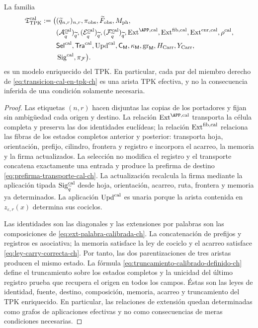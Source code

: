 \begin{proposition}
\label{prop:modelo-tpk-calibrado-ch}
La familia
\[
\begin{aligned}
 \mathfrak T_{\rm TPK}^{\rm cal}:=\bigl(
 &(\widetilde q_{n,r})_{n,r},\pi_{\rm obs},
   \widetilde F_{\rm obs},M_{\rm ph},\\
 &(\mathcal A_{\widetilde q}^{\rm cal})_{\widetilde q},
   (\mathcal E_{\widetilde q}^{\rm cal})_{\widetilde q},
   (\mathcal F_{\widetilde q}^{\rm cal})_{\widetilde q},
   \operatorname{Ext}^{\APP,\rm cal},
   \operatorname{Ext}^{\rm fib,cal},
   \operatorname{Ext}^{\rm enr,cal},\rho^{\rm cal},\\
 &\mathsf{Sel}^{\rm cal},\mathsf{Tra}^{\rm cal},
   \operatorname{Upd}^{\rm cal},\mathsf C_{\mathsf M},
   \kappa_{\mathsf M},\operatorname{gr}_{\mathsf M},
   H_{\rm Carr},Y_{\rm Carr},\\
 &\operatorname{Sig}^{\rm cal},\pi_{\mathcal F}\bigr).
\end{aligned}
\]
es un modelo enriquecido del TPK. En particular, cada par del miembro derecho
de \eqref{eq:transicion-cal-en-tpk-ch} es una arista TPK efectiva, y no la
consecuencia inferida de una condición solamente necesaria.
\end{proposition}

\begin{proof}
Las etiquetas \((n,r)\) hacen disjuntas las copias de los portadores y fijan
sin ambigüedad cada origen y destino. La relación
\(\operatorname{Ext}^{\APP,\rm cal}\) transporta la célula completa y
preserva las dos identidades euclídeas; la relación
\(\operatorname{Ext}^{\rm fib,cal}\) relaciona las fibras de los estados
completos anterior y posterior: transporta hoja, orientación, prefijo,
cilindro, frontera y registro e incorpora el acarreo, la memoria y la firma
actualizados. La selección no modifica el registro y el transporte concatena
exactamente una entrada y produce la prefirma de destino
\eqref{eq:prefirma-transporte-cal-ch}. La actualización recalcula la firma mediante la
aplicación tipada \(\operatorname{Sig}^{\rm cal}_{\widetilde q}\) desde
hoja, orientación, acarreo, ruta, frontera y memoria ya determinados. La aplicación
\(\operatorname{Upd}^{\rm cal}\) es unaria porque la arista contenida en
\(z_{\varepsilon,r}(x)\) determina sus cociclos.

Las identidades son las diagonales y las extensiones por palabras son las
composiciones de \eqref{eq:ext-palabra-calibrada-ch}. La concatenación de
prefijos y registros es asociativa; la memoria satisface la ley de cociclo y
el acarreo satisface
\eqref{eq:ley-carry-correcta-ch}. Por tanto, las dos parentizaciones de tres
aristas producen el mismo estado. La fórmula
\eqref{eq:truncamiento-calibrado-definido-ch} define el truncamiento sobre
los estados completos y la unicidad del último registro prueba que recupera
el origen en todos los campos. Éstas son las leyes de identidad, fuente,
destino, composición, memoria, acarreo y truncamiento del TPK enriquecido.
En particular, las relaciones de extensión quedan determinadas como grafos
de aplicaciones efectivas y no como consecuencias de meras condiciones
necesarias.
\end{proof}

